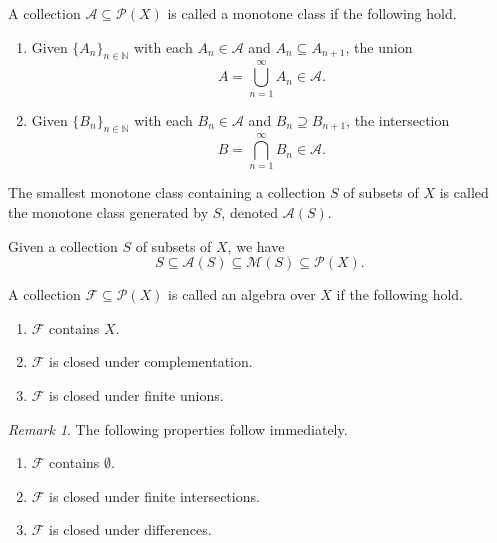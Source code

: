 \documentclass[11pt]{article}
\newcommand{\N}{\mathbb{N}}
\newcommand{\M}{\mathcal{M}}
\theoremstyle{definition}
\theoremstyle{remark}
\newtheorem*{remark}{Remark}
\numberwithin{equation}{section}
\begin{document}
    \begin{definition}
        A collection $\mathcal{A} \subseteq \mathcal{P}(X)$ is called a monotone
        class if the following hold.
        \begin{enumerate}
            \itemsep0em
            \item Given $\{A_n\}_{n \in \N}$ with each $A_n \in \mathcal{A}$ and $A_n
            \subseteq A_{n + 1}$, the union \[
                A = \bigcup_{n = 1}^\infty A_n \in \mathcal{A}.
            \] 
            \item Given $\{B_n\}_{n \in \N}$ with each $B_n \in \mathcal{A}$ and $B_n
            \supseteq B_{n + 1}$, the intersection \[
                B = \bigcap_{n = 1}^\infty B_n \in \mathcal{A}.
            \] 
        \end{enumerate}
    \end{definition}

    \begin{definition}
        The smallest monotone class containing a collection $S$ of subsets of $X$ is
        called the monotone class generated by $S$, denoted $\mathcal{A}(S)$.
    \end{definition}

    \begin{lemma}
        Given a collection $S$ of subsets of $X$, we have \[
            S \subseteq \mathcal{A}(S) \subseteq \M(S) \subseteq \mathcal{P}(X).
        \] 
    \end{lemma}

    \begin{definition}
        A collection $\mathcal{F} \subseteq \mathcal{P}(X)$ is called an algebra over
        $X$ if the following hold.
        \begin{enumerate}
            \itemsep0em
            \item $\mathcal{F}$ contains $X$.
            \item $\mathcal{F}$ is closed under complementation.
            \item $\mathcal{F}$ is closed under finite unions.
        \end{enumerate}
        \begin{remark}
            The following properties follow immediately.
            \begin{enumerate}
                \itemsep0em
                \item $\mathcal{F}$ contains $\emptyset$.
                \item $\mathcal{F}$ is closed under finite intersections.
                \item $\mathcal{F}$ is closed under differences.
            \end{enumerate}
        \end{remark}
    \end{definition}
\end{document}

